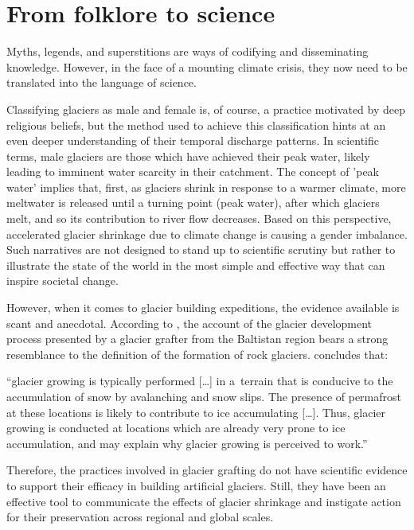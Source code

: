 \section{From folklore to science}

Myths, legends, and superstitions are ways of codifying and disseminating knowledge. However, in the face of a
mounting climate crisis, they now need to be translated into the language of science. 

Classifying glaciers as male and female is, of course, a practice motivated by deep religious beliefs, but the
method used to achieve this classification hints at an even deeper understanding of their temporal discharge
patterns. In scientific terms, male glaciers are those which have achieved their peak water, likely leading to
imminent water scarcity in their catchment. The concept of 'peak water' implies that, first, as glaciers shrink
in response to a warmer climate, more meltwater is released until a turning point (peak water), after which
glaciers melt, and so its contribution to river flow decreases. Based on this perspective, accelerated glacier
shrinkage due to climate change is causing a gender imbalance. Such narratives are not designed to stand up to
scientific scrutiny but rather to illustrate the state of the world in the most simple and effective way that
can inspire societal change. 

However, when it comes to glacier building expeditions, the evidence available is scant and anecdotal. According
to \citet{tveitenGlacierGrowingLocal2007}, the account of the glacier development process presented by a glacier
grafter from the Baltistan region bears a strong resemblance to the definition of the formation of rock
glaciers. \citet{tveitenGlacierGrowingLocal2007} concludes that: 

\begin{thesis_quotation}

“glacier growing is typically performed […] in a terrain that is conducive to the accumulation of snow by
avalanching and snow slips. The presence of permafrost at these locations is likely to contribute to ice
accumulating […]. Thus, glacier growing is conducted at locations which are already very prone to ice
accumulation, and may explain why glacier growing is perceived to work.” 

\end{thesis_quotation}

Therefore, the practices involved in glacier grafting do not have scientific evidence to support their efficacy
in building artificial glaciers. Still, they have been an effective tool to communicate the effects of glacier
shrinkage and instigate action for their preservation across regional and global scales. 


